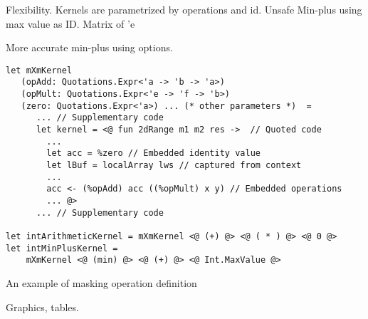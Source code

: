 Flexibility. Kernels are parametrized by operations and id.
Unsafe Min-plus using max value as ID.
Matrix of 'e

More accurate min-plus using options.

\begin{listing}[h]
  \begin{verbatim}
let mXmKernel    
   (opAdd: Quotations.Expr<'a -> 'b -> 'a>) 
   (opMult: Quotations.Expr<'e -> 'f -> 'b>) 
   (zero: Quotations.Expr<'a>) ... (* other parameters *)  =
      ... // Supplementary code
      let kernel = <@ fun 2dRange m1 m2 res ->  // Quoted code
        ... 
        let acc = %zero // Embedded identity value
        let lBuf = localArray lws // captured from context
        ... 
        acc <- (%opAdd) acc ((%opMult) x y) // Embedded operations
        ... @>
      ... // Supplementary code
  
let intArithmeticKernel = mXmKernel <@ (+) @> <@ ( * ) @> <@ 0 @>
let intMinPlusKernel = 
    mXmKernel <@ (min) @> <@ (+) @> <@ Int.MaxValue @>
  \end{verbatim}
  \caption{An example of masking operation definition}
  \label{lst:mXm_kernels}
\end{listing}

Graphics, tables.
